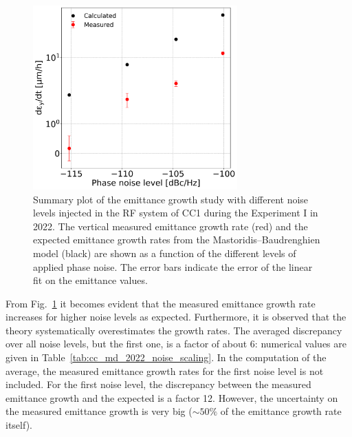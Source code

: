 \begin{figure}[!h]
   \centering         
   \includegraphics[width=0.7\textwidth]{images/Ch8/emit_V_background_subtracted_noise_scan_final.png}
       \caption{Summary plot of the emittance growth study with different noise levels injected in the RF system of CC1 during the Experiment I in 2022. The vertical measured emittance growth rate (red) and the expected emittance growth rates from the Mastoridis--Baudrenghien model (black) are shown as a function of the different levels of applied phase noise. The error bars indicate the error of the linear fit on the emittance values.}
       \label{fig:V_emit_growth_background_subtracted_noise_scan}
\end{figure}

From Fig.~\ref{fig:V_emit_growth_background_subtracted_noise_scan} it becomes evident that the measured emittance growth rate increases for higher noise levels as expected. Furthermore, it is observed that the theory systematically overestimates the growth rates. The averaged discrepancy over all noise levels, but the first one, is a factor of about 6: numerical values are given in Table~\ref{tab:cc_md_2022_noise_scaling}. In the computation of the average, the measured emittance growth rates for the first noise level is not included. For the first noise level, the discrepancy between the measured emittance growth and the expected is a factor 12. However, the uncertainty on the measured emittance growth is very big ($\sim 50\%$ of the emittance growth rate itself).

